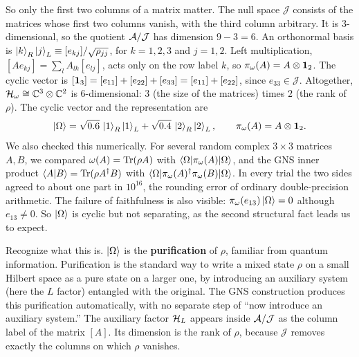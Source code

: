 So only the first two columns of a matrix matter. The null space $\mathcal J$ consists of the matrices whose
first two columns vanish, with the third column arbitrary. It is 3-dimensional, so the quotient
$\mathcal{A}/\mathcal J$ has dimension $9-3=6$. An orthonormal basis is
$\ket k_R\ket j_L\equiv[e_{kj}]/\sqrt{\rho_{jj}}$, for $k=1,2,3$ and $j=1,2$. Left multiplication,
$[Ae_{kj}]=\sum_lA_{lk}[e_{lj}]$, acts only on the row label $k$, so $\pi_\omega(A)=A\otimes\mathbf{1}_2$. The cyclic
vector is $[\mathbf{1}_3]=[e_{11}]+[e_{22}]+[e_{33}]=[e_{11}]+[e_{22}]$, since $e_{33}\in\mathcal J$. Altogether,
$\mathcal{H}_\omega\cong\mathbb C^3\otimes\mathbb C^2$ is 6-dimensional: $3$ (the size of the matrices) times $2$ (the
rank of $\rho$). The cyclic vector and the representation are
\[
\ket\Omega=\sqrt{0.6}\,\ket1_R\ket1_L+\sqrt{0.4}\,\ket2_R\ket2_L ,
\qquad
\pi_\omega(A)=A\otimes\mathbf{1}_2 .
\]
We also checked this numerically. For several random complex $3\times3$ matrices $A,B$, we compared
$\omega(A)=\operatorname{Tr}(\rho A)$ with $\braket{\Omega|\pi_\omega(A)|\Omega}$, and the GNS inner product
$\braket{A|B}=\operatorname{Tr}(\rho A^\dagger B)$ with $\braket{\Omega|\pi_\omega(A)^\dagger\pi_\omega(B)|\Omega}$. In every
trial the two sides agreed to about one part in $10^{16}$, the rounding error of ordinary double-precision
arithmetic. The failure of faithfulness is also visible: $\pi_\omega(e_{13})\ket\Omega=0$ although
$e_{13}\ne0$. So $\ket\Omega$ is cyclic but not separating, as the second structural fact leads us to expect.

Recognize what this is. $\ket\Omega$ is the \textbf{purification} of $\rho$, familiar from quantum
information. Purification is the standard way to write a mixed state $\rho$ on a small Hilbert space as a
pure state on a larger one, by introducing an auxiliary system (here the $L$ factor) entangled with the
original. The GNS construction produces this purification automatically, with no separate step of ``now
introduce an auxiliary system.'' The auxiliary factor $\mathcal{H}_L$ appears inside $\mathcal{A}/\mathcal J$ as the column
label of the matrix $[A]$. Its dimension is the rank of $\rho$, because $\mathcal J$ removes exactly the
columns on which $\rho$ vanishes.

